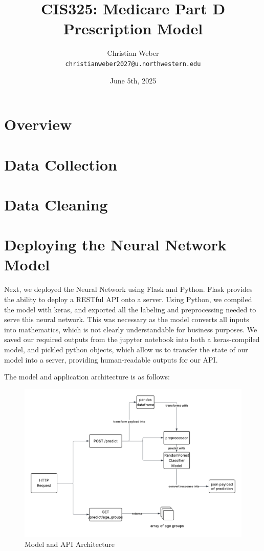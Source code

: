 \documentclass{article}
\begin{document}
\title{CIS325: Medicare Part D Prescription Model}
\author{
  Christian Weber\\
  \texttt{christianweber2027@u.northwestern.edu}
}

\date{June 5th, 2025}
\maketitle

\section{Overview}

\section{Data Collection}

\section{Data Cleaning}

\section{Deploying the Neural Network Model}
Next, we deployed the Neural Network using Flask and Python. Flask provides the ability to deploy a RESTful API onto a server. Using Python, we compiled the model with keras, and exported all the labeling and preprocessing needed to serve this neural network. This was necessary as the model converts all inputs into mathematics, which is not clearly understandable for business purposes. We saved our required outputs from the jupyter notebook into both a keras-compiled model, and pickled python objects, which allow us to transfer the state of our model into a server, providing human-readable outputs for our API.

The model and application architecture is as follows:

\begin{figure}[H]
    \centering
    \includegraphics[width=0.75\linewidth]{paper/Code Layout-Final.png}
    \caption{Model and API Architecture}
    \label{fig:enter-label}
\end{figure}
\end{document}
